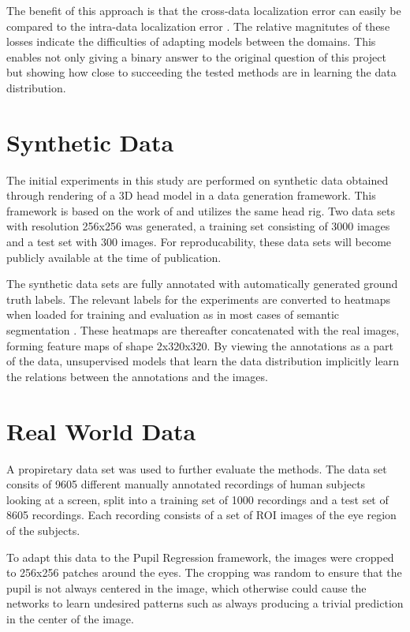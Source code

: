 The benefit of this approach is that the cross-data localization error can easily be compared to the intra-data localization error . The relative magnitutes of these losses indicate the difficulties of adapting models between the domains. This enables not only giving a binary answer to the original question of this project but showing how close to succeeding the tested methods are in learning the data distribution.

\section{Synthetic Data}
The initial experiments in this study are performed on synthetic data obtained through rendering of a 3D head model in a data generation framework. This framework is based on the work of \textcite{swirski2014rendering} and utilizes the same head rig. Two data sets with resolution 256x256 was generated, a training set consisting of 3000 images and a test set with 300 images. For reproducability, these data sets will become publicly available at the time of publication.

The synthetic data sets are fully annotated with automatically generated ground truth labels. The relevant labels for the experiments are converted to heatmaps when loaded for training and evaluation as in most cases of semantic segmentation \parencite{guo2017review}. These heatmaps are thereafter concatenated with the real images, forming feature maps of shape 2x320x320. By viewing the annotations as a part of the data, unsupervised models that learn the data distribution implicitly learn the relations between the annotations and the images.

\section{Real World Data}
A propiretary data set was used to further evaluate the methods. The data set consits of 9605 different manually annotated recordings of human subjects looking at a screen, split into a training set of 1000 recordings and a test set of 8605 recordings. Each recording consists of a set of ROI images of the eye region of the subjects. 

To adapt this data to the Pupil Regression framework, the images were cropped to 256x256 patches around the eyes. The cropping was random to ensure that the pupil is not always centered in the image, which otherwise could cause the networks to learn undesired patterns such as always producing a trivial prediction in the center of the image. 

